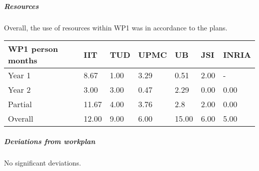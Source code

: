 

\subparagraph{Resources}
Overall, the use of resources within WP1 was in accordance to the plans. 

\begin{center}
  \begin{tabular}{|C{1.5cm}|C{1.5cm}|C{1.5cm}|C{2cm}|C{2cm}|C{2cm}|C{2cm}|}
    \hline \footnotesize \textbf{WP1 person months}& \footnotesize
    \textbf{IIT}&\footnotesize \textbf{TUD}&\footnotesize \textbf{UPMC}&
    \footnotesize \textbf{UB} &\footnotesize \textbf{JSI} & \footnotesize \textbf{INRIA}\\
    \hline \footnotesize Year 1 & 8.67 &1.00 & 3.29 & 0.51 & 2.00 & -\\
    \hline \footnotesize Year 2 & 3.00 & 3.00 & 0.47 & 2.29 & 0.00 & 0.00 \\
    \hline \footnotesize Partial & 11.67 & 4.00 & 3.76 & 2.8 & 2.00 & 0.00\\ \hline
    \hline \footnotesize Overall & 12.00 & 9.00 & 6.00 & 15.00 & 6.00 & 5.00 \\
    \hline
  \end{tabular}
\end{center}

\subparagraph{Deviations from workplan} 
No significant deviations. 
